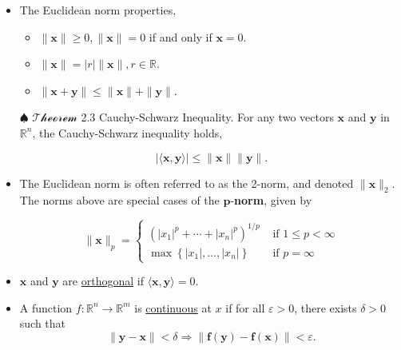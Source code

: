 \documentclass[12pt,thmsa]{article}
\begin{document}
\begin{itemize}
	\item The Euclidean norm properties,
	\begin{itemize}
		\item \(\|\boldsymbol{x}\| \geq 0,\|\boldsymbol{x}\|=0\) if and only if \(\boldsymbol{x}=0\).
		
		\item \(\|\boldsymbol{x}\|=|r|\|\boldsymbol{x}\|, r \in \mathbb{R}\).
		
		\item \(\|\boldsymbol{x}+\boldsymbol{y}\| \leq\|\boldsymbol{x}\|+\|\boldsymbol{y}\|\).
	\end{itemize}
	\item[\(\spadesuit\)] \(\mathcal{Theorem}\) 2.3 Cauchy-Schwarz Inequality. For any two vectors \(\boldsymbol{x}\) and \(\boldsymbol{y}\) in \(\mathbb{R}^{n}\), the Cauchy-Schwarz inequality holds,
	
	\begin{equation*}
		|\langle\boldsymbol{x}, \boldsymbol{y}\rangle| \leq\|\boldsymbol{x}\|\|\boldsymbol{y}\|.
	\end{equation*}	
	
\end{itemize}

\begin{itemize}
	
	\item The Euclidean norm is often referred to as the 2-norm, and denoted \(\|\boldsymbol{x}\|_{2} \). The norms above are special cases of the \(\boldsymbol{p}\)-\textbf{norm}, given by
	
	\[
	\|\boldsymbol{x}\|_{p}=\left\{\begin{array}{ll}
		\left(\left|x_{1}\right|^{p}+\cdots+\left|x_{n}\right|^{p}\right)^{1 / p} & \text { if } 1 \leq p<\infty \\
		\max \left\{\left|x_{1}\right|, \ldots,\left|x_{n}\right|\right\} & \text { if } p=\infty
	\end{array}\right.
	\]
\end{itemize}
	
\begin{itemize}
	\item \(\boldsymbol{x}\) and \(\boldsymbol{y}\) are \underline{orthogonal} if \(\langle\boldsymbol{x}, \boldsymbol{y}\rangle=0\).
	
	\item A function \(f: \mathbb{R}^{n} \rightarrow \mathbb{R}^{m}\) is \underline{continuous} at \(x\) if for all \(\varepsilon>0\), there exists \(\delta>0\) such that \[\|\boldsymbol{y}-\boldsymbol{x}\|<\delta \Rightarrow\|\boldsymbol{f}(\boldsymbol{y})-\boldsymbol{f}(\boldsymbol{x})\|<\varepsilon.\]
	
\end{itemize}
\end{document}
